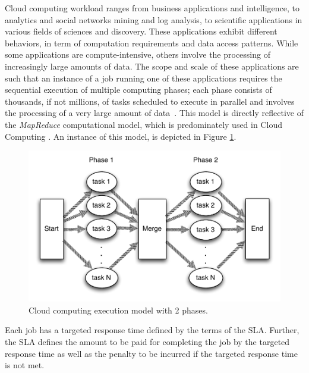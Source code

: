 
Cloud computing workload ranges from business applications and
intelligence, to analytics and social networks mining and log
analysis, to scientific applications in various fields of sciences and
discovery. These applications exhibit different behaviors, in term of
computation requirements and data access patterns. While some
applications are compute-intensive, others involve the processing of
increasingly large amounts of data. The scope and scale of these
applications are such that an instance of a job running one of these
applications requires the sequential execution of multiple computing
phases; each phase consists of thousands, if not millions, of tasks
scheduled to execute in parallel and involves the processing of a very
large amount of data~\cite{lin2010data,Ferdman:2012:CCS:2150976.2150982}. This
model is directly reflective of the \emph{MapReduce} computational
model, which is predominately used in
Cloud Computing \cite{mrbs}.  An instance of this model, is depicted in Figure \ref{fig:system_model}.


\begin{figure}[!h]
	\begin{center}
		\includegraphics[width=\columnwidth]{diagrams/system_model_1.pdf}
	\end{center}
	\caption{Cloud computing execution model with 2 phases.}
	\label{fig:system_model}
\end{figure}

Each job has a targeted response time defined
by the terms of the SLA. Further, the SLA defines the amount to be
paid for completing the job by the targeted response time as well as
the penalty to be incurred if the targeted response time is not
met. 

